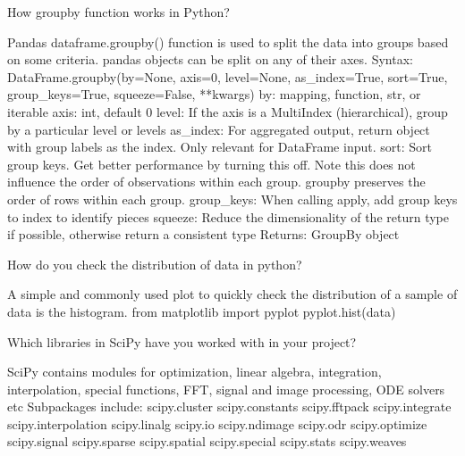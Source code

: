 	\begin{qanda}
		\begin{question}
How groupby function works in Python?
		\end{question}
		\begin{answer}
Pandas dataframe.groupby() function is used to split the data into groups based on some criteria. pandas objects can be split on any of their axes. Syntax: DataFrame.groupby(by=None, axis=0, level=None, as\_index=True, sort=True, group\_keys=True, squeeze=False, **kwargs) by: mapping, function, str, or iterable axis: int, default 0 level: If the axis is a MultiIndex (hierarchical), group by a particular level or levels as\_index: For aggregated output, return object with group labels as the index. Only relevant for DataFrame input. sort: Sort group keys. Get better performance by turning this off. Note this does not influence the order of observations within each group. groupby preserves the order of rows within each group. group\_keys: When calling apply, add group keys to index to identify pieces squeeze: Reduce the dimensionality of the return type if possible, otherwise return a consistent type Returns: GroupBy object
		\end{answer}
	\end{qanda}

	\begin{qanda}
		\begin{question}
How do you check the distribution of data in python?
		\end{question}
		\begin{answer}
A simple and commonly used plot to quickly check the distribution of a sample of data is the histogram. from matplotlib import pyplot pyplot.hist(data)
		\end{answer}
	\end{qanda}

	\begin{qanda}
		\begin{question}
Which libraries in SciPy have you worked with in your project?
		\end{question}
		\begin{answer}
SciPy contains modules for optimization, linear algebra, integration, interpolation, special functions, FFT, signal and image processing, ODE solvers etc Subpackages include: scipy.cluster scipy.constants scipy.fftpack scipy.integrate scipy.interpolation scipy.linalg scipy.io scipy.ndimage scipy.odr scipy.optimize scipy.signal scipy.sparse scipy.spatial scipy.special scipy.stats scipy.weaves
		\end{answer}
	\end{qanda}


